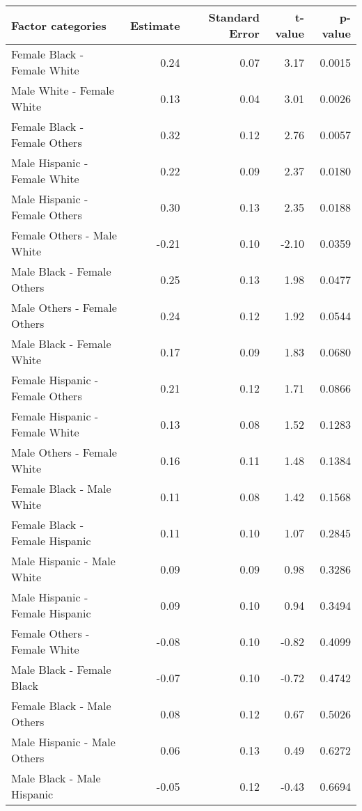 \documentclass[11pt]{extarticle} %
\begin{document}
\begin{table}[H]
\footnotesize
\centering
\begin{tabular}{lrrrr}
  \hline
  Factor categories & Estimate & Standard Error & t-value & p-value \\ 
  \hline
    Female Black -  Female White & 0.24 & 0.07 & 3.17 & 0.0015 \\ 
    Male White -  Female White & 0.13 & 0.04 & 3.01 & 0.0026 \\ 
    Female Black -  Female Others & 0.32 & 0.12 & 2.76 & 0.0057 \\ 
    Male Hispanic -  Female White & 0.22 & 0.09 & 2.37 & 0.0180 \\ 
    Male Hispanic -  Female Others & 0.30 & 0.13 & 2.35 & 0.0188 \\ 
    Female Others -  Male White & -0.21 & 0.10 & -2.10 & 0.0359 \\ 
    Male Black -  Female Others & 0.25 & 0.13 & 1.98 & 0.0477 \\ 
    Male Others -  Female Others & 0.24 & 0.12 & 1.92 & 0.0544 \\ 
    Male Black -  Female White & 0.17 & 0.09 & 1.83 & 0.0680 \\ 
    Female Hispanic -  Female Others & 0.21 & 0.12 & 1.71 & 0.0866 \\ 
    Female Hispanic -  Female White & 0.13 & 0.08 & 1.52 & 0.1283 \\ 
    Male Others -  Female White & 0.16 & 0.11 & 1.48 & 0.1384 \\ 
    Female Black -  Male White & 0.11 & 0.08 & 1.42 & 0.1568 \\ 
    Female Black -  Female Hispanic & 0.11 & 0.10 & 1.07 & 0.2845 \\ 
    Male Hispanic -  Male White & 0.09 & 0.09 & 0.98 & 0.3286 \\ 
    Male Hispanic -  Female Hispanic & 0.09 & 0.10 & 0.94 & 0.3494 \\ 
    Female Others -  Female White & -0.08 & 0.10 & -0.82 & 0.4099 \\ 
    Male Black -  Female Black & -0.07 & 0.10 & -0.72 & 0.4742 \\ 
    Female Black -  Male Others & 0.08 & 0.12 & 0.67 & 0.5026 \\ 
    Male Hispanic -  Male Others & 0.06 & 0.13 & 0.49 & 0.6272 \\ 
    Male Black -  Male Hispanic & -0.05 & 0.12 & -0.43 & 0.6694 \\ 

\end{tabular}
\end{table}
\end{document}
